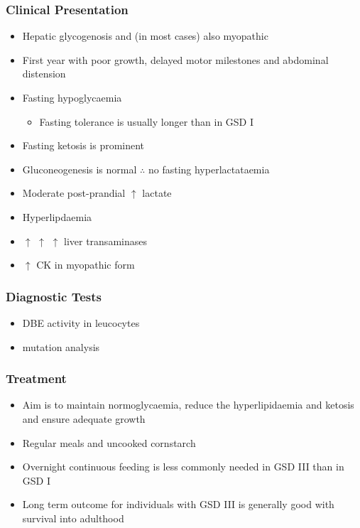 \documentclass{scrartcl}
\begin{document}
\subsubsection{Clinical Presentation}
\label{sec:org59651a8}
\begin{itemize}
\item Hepatic glycogenosis and (in most cases) also myopathic
\item First year with poor growth, delayed motor milestones and abdominal
distension
\item Fasting hypoglycaemia 
\begin{itemize}
\item Fasting tolerance is usually longer than in GSD I
\end{itemize}
\item Fasting ketosis is prominent
\item Gluconeogenesis is normal \(\therefore\) no fasting hyperlactataemia
\item Moderate post-prandial \(\uparrow\) lactate
\item Hyperlipdaemia
\item \(\uparrow\) \(\uparrow\) \(\uparrow\) liver transaminases
\item \(\uparrow\) CK in myopathic form
\end{itemize}
\subsubsection{Diagnostic Tests}
\label{sec:org839fa78}
\begin{itemize}
\item DBE activity in leucocytes
\item mutation analysis
\end{itemize}
\subsubsection{Treatment}
\label{sec:org1e255ec}
\begin{itemize}
\item Aim is to maintain normoglycaemia, reduce the hyperlipidaemia and ketosis and
ensure adequate growth
\item Regular meals and uncooked cornstarch
\item Overnight continuous feeding is less commonly needed in GSD III than
in GSD I
\item Long term outcome for individuals with GSD III is generally good
with survival into adulthood
\end{itemize}
\end{document}

